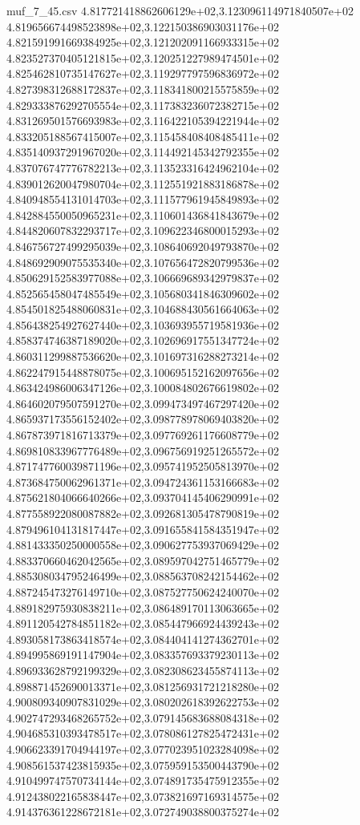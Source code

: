 \begin{filecontents*}{muf_7_45.csv}
4.817721418862606129e+02,3.123096114971840507e+02
4.819656674498523898e+02,3.122150386903031176e+02
4.821591991669384925e+02,3.121202091166933315e+02
4.823527370405121815e+02,3.120251227989474501e+02
4.825462810735147627e+02,3.119297797596836972e+02
4.827398312688172837e+02,3.118341800215575859e+02
4.829333876292705554e+02,3.117383236072382715e+02
4.831269501576693983e+02,3.116422105394221944e+02
4.833205188567415007e+02,3.115458408408485411e+02
4.835140937291967020e+02,3.114492145342792355e+02
4.837076747776782213e+02,3.113523316424962104e+02
4.839012620047980704e+02,3.112551921883186878e+02
4.840948554131014703e+02,3.111577961945849893e+02
4.842884550050965231e+02,3.110601436841843679e+02
4.844820607832293717e+02,3.109622346800015293e+02
4.846756727499295039e+02,3.108640692049793870e+02
4.848692909075535340e+02,3.107656472820799536e+02
4.850629152583977088e+02,3.106669689342979837e+02
4.852565458047485549e+02,3.105680341846309602e+02
4.854501825488060831e+02,3.104688430561664063e+02
4.856438254927627440e+02,3.103693955719581936e+02
4.858374746387189020e+02,3.102696917551347724e+02
4.860311299887536620e+02,3.101697316288273214e+02
4.862247915448878075e+02,3.100695152162097656e+02
4.863424986006347126e+02,3.100084802676619802e+02
4.864602079507591270e+02,3.099473497467297420e+02
4.865937173556152402e+02,3.098778978069403820e+02
4.867873971816713379e+02,3.097769261176608779e+02
4.869810833967776489e+02,3.096756919251265572e+02
4.871747760039871196e+02,3.095741952505813970e+02
4.873684750062961371e+02,3.094724361153166683e+02
4.875621804066640266e+02,3.093704145406290991e+02
4.877558922080087882e+02,3.092681305478790819e+02
4.879496104131817447e+02,3.091655841584351947e+02
4.881433350250000558e+02,3.090627753937069429e+02
4.883370660462042565e+02,3.089597042751465779e+02
4.885308034795246499e+02,3.088563708242154462e+02
4.887245473276149710e+02,3.087527750624240070e+02
4.889182975930838211e+02,3.086489170113063665e+02
4.891120542784851182e+02,3.085447966924439243e+02
4.893058173863418574e+02,3.084404141274362701e+02
4.894995869191147904e+02,3.083357693379230113e+02
4.896933628792199329e+02,3.082308623455874113e+02
4.898871452690013371e+02,3.081256931721218280e+02
4.900809340907831029e+02,3.080202618392622753e+02
4.902747293468265752e+02,3.079145683688084318e+02
4.904685310393478517e+02,3.078086127825472431e+02
4.906623391704944197e+02,3.077023951023284098e+02
4.908561537423815935e+02,3.075959153500443790e+02
4.910499747570734144e+02,3.074891735475912355e+02
4.912438022165838447e+02,3.073821697169314575e+02
4.914376361228672181e+02,3.072749038800375274e+02

\end{filecontents*}
